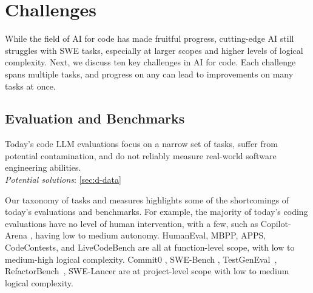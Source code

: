 \section{Challenges} \label{sec:challenges}


While the field of AI for code has made fruitful progress, cutting-edge AI still struggles with SWE tasks, especially at larger scopes and higher levels of logical complexity. Next, we discuss ten key challenges in AI for code. Each challenge spans multiple tasks, and progress on any can lead to improvements on many tasks at once.

\subsection{Evaluation and Benchmarks} \label{sec:c-evaluation}

\begin{tcolorbox}[colback=lightgreen, boxrule=0pt, arc=5pt, outer arc=5pt, after skip=10pt plus 2pt]
Today's code LLM evaluations focus on a narrow set of tasks, suffer from potential contamination, and do not reliably measure real-world software engineering abilities.
\\
\newline
\textit{Potential solutions}: \ref{sec:d-data}
\end{tcolorbox}

Our taxonomy of tasks and measures highlights some of the shortcomings of today's evaluations and benchmarks. For example, the majority of today's coding evaluations have no level of human intervention, with a few, such as Copilot-Arena \citep{chi2025copilotarena}, having low to medium autonomy. 
HumanEval, MBPP, APPS, CodeContests, and LiveCodeBench are all at function-level scope, with low to medium-high logical complexity. 
Commit0 \citep{zhao2024commit0}, SWE-Bench \citep{jimenez2024swebench}, TestGenEval~\citep{jain2024testgeneval}, RefactorBench~\citep{gautam2024refactorbench}, SWE-Lancer \citep{miserendino2025swe} are at project-level scope with low to medium logical complexity. %

